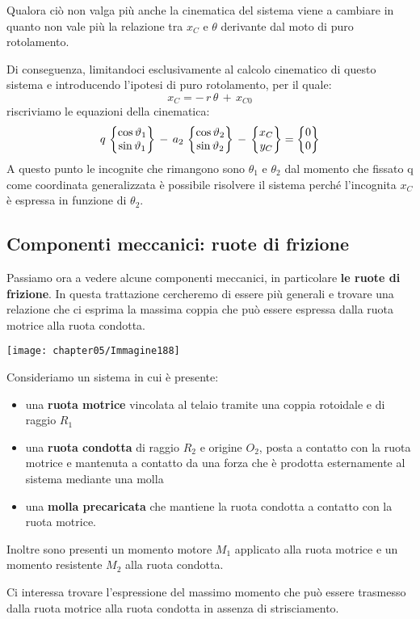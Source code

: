 Qualora ciò non valga più anche la cinematica del sistema viene a cambiare in quanto non vale più la relazione tra $x_C$ e $\theta$ derivante dal moto di puro rotolamento.

Di conseguenza, limitandoci esclusivamente al calcolo cinematico di questo sistema e introducendo l'ipotesi di puro rotolamento, per il quale:
\[x_C = -\,r\,\theta\,+\,x_{C0}\]
riscriviamo le equazioni della cinematica:
\[q\,\begin{Bmatrix}\cos{\vartheta_1}\\\sin{\vartheta_1}\end{Bmatrix}\,-\,a_2\,\begin{Bmatrix}\cos{\vartheta_2}\\\sin{\vartheta_2}\end{Bmatrix}\,-\,\begin{Bmatrix}x_C\\y_C\end{Bmatrix} = \begin{Bmatrix}0\\0\end{Bmatrix}\]
A questo punto le incognite che rimangono sono $\theta_1$ e $\theta_2$ dal momento che fissato q come coordinata generalizzata è possibile risolvere il sistema perché l'incognita $x_C$ è espressa in funzione di $\theta_2$.

\subsection{Componenti meccanici: ruote di frizione}

Passiamo ora a vedere alcune componenti meccanici, in particolare \textbf{le ruote di frizione}. In questa trattazione cercheremo di essere più generali e trovare una relazione che ci esprima la massima coppia che può essere espressa dalla ruota motrice alla ruota condotta.
\begin{center}
\texttt{[image: chapter05/Immagine188]}
\end{center}

Consideriamo un sistema in cui è presente:
\begin{itemize}
\item una \textbf{ruota motrice} vincolata al telaio tramite una coppia rotoidale e di raggio $R_1$
\item una \textbf{ruota condotta} di raggio $R_2$ e origine $O_2$, posta a contatto con la ruota motrice e mantenuta a contatto da una forza che è prodotta esternamente al sistema mediante una molla
\item una \textbf{molla precaricata} che mantiene la ruota condotta a contatto con la ruota motrice.
\end{itemize}
Inoltre sono presenti un momento motore $M_1$ applicato alla ruota motrice e un momento resistente $M_2$ alla ruota condotta.

Ci interessa trovare l'espressione del massimo momento che può essere trasmesso dalla ruota motrice alla ruota condotta in assenza di strisciamento.

